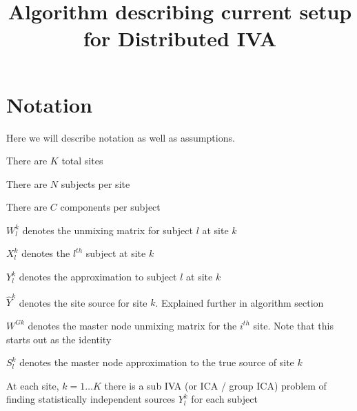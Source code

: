 \documentclass{amsproc}
\title{Algorithm describing current setup for Distributed IVA}
\begin{document}
\maketitle

\section{Notation} Here we will describe notation as well as assumptions.

There are $K$ total sites

There are $N$ subjects per site

There are $C$ components per subject

$W^k_l$ denotes the unmixing matrix for subject $l$ at site $k$

$X^k_l$ denotes the $l^{th}$ subject at site $k$

$Y^k_l$ denotes the approximation to subject $l$ at site $k$

$\hat{Y}^k$ denotes the site source for site $k$. Explained further in algorithm section

$W^{Gk}$ denotes the master node unmixing matrix for the $i^{th}$ site. Note that this starts out as the identity

$S^k_l$ denotes the master node approximation to the true source of site $k$



At each site, $k=1 \dots K$ there is a sub IVA (or ICA / group ICA) problem of finding statistically independent sources $Y^k_l$ for each subject
\end{document}
